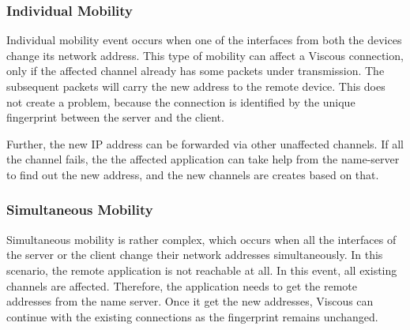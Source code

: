 \subsubsection{Individual Mobility}
Individual mobility event occurs when one of the interfaces from both the devices change its network address. This type of mobility can affect a Viscous connection, only if the affected channel already has some packets under transmission. The subsequent packets will carry the new address to the remote device. This does not create a problem, because the connection is identified by the unique fingerprint between the server and the client. 

Further, the new IP address can be forwarded via other unaffected channels. If all the channel fails, the the affected application can take help from the name-server to find out the new address, and the new channels are creates based on that.

\subsubsection{Simultaneous Mobility}
Simultaneous mobility is rather complex, which occurs when all the interfaces of the server or the client change their network addresses simultaneously. In this scenario, the remote application is not reachable at all. In this event, all existing channels are affected. Therefore, the application needs to get the remote addresses from the name server. Once it get the new addresses, Viscous can continue with the existing connections as the fingerprint remains unchanged.
